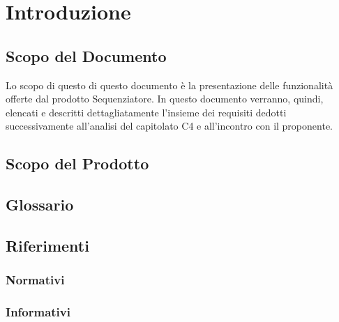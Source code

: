 \section{Introduzione}
\subsection{Scopo del Documento}
Lo scopo di questo di questo documento è la presentazione delle funzionalità offerte dal prodotto Sequenziatore. In questo documento verranno, quindi, elencati e descritti dettagliatamente l'insieme dei requisiti dedotti successivamente all'analisi del capitolato C4 e all'incontro con il proponente.
\subsection{Scopo del Prodotto}
\subsection{Glossario}
\subsection{Riferimenti}
\subsubsection{Normativi}
\subsubsection{Informativi}